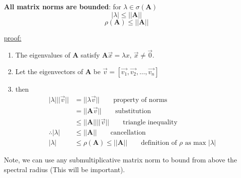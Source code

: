 \documentclass[12pt]{article}
\newcommand{\ve}[1]{\ensuremath{\mathbf{#1}}}
\begin{document}
\textbf{All matrix norms are bounded}: for $\lambda \in \sigma(\ve{A})$ 
\[|\lambda | \leq ||\ve{A}||\]
\[\rho(\ve{A}) \leq ||\ve{A}||\]

\underline{proof:} 
\begin{enumerate}
\item The eigenvalues of $\ve{A}$ satisfy $\ve{A}\vec{x} = \lambda x$, $\vec{x} \neq \vec{0}$. 

\item Let the eigenvectors of $\ve{A}$ be $\vec{v} = [\vec{v_1}, \vec{v_2}, \dots, \vec{v_n}]$

\item then 
\begin{align}
|\lambda | ||\vec{v}|| &= ||\lambda \vec{v}|| 
\qquad \text{property of norms} \nonumber \\
%
                     &= ||\ve{A}\vec{v}|| 
                     \qquad \text{substitution} \nonumber \\
%
                     &\leq ||\ve{A}|| ||\vec{v}||
                     \qquad \text{triangle inequality} \nonumber \\
%
\therefore |\lambda | &\leq ||\ve{A}|| 
\qquad \text{cancellation}\nonumber \\
%
|\lambda| &\leq \rho(\ve{A}) \leq ||\ve{A}|| 
\qquad \text{definition of }\rho\text{ as max }|\lambda | \nonumber
\end{align}
\end{enumerate}

Note, we can use any submultiplicative matrix norm to bound from above the spectral radius (This will be important).



\end{document}
